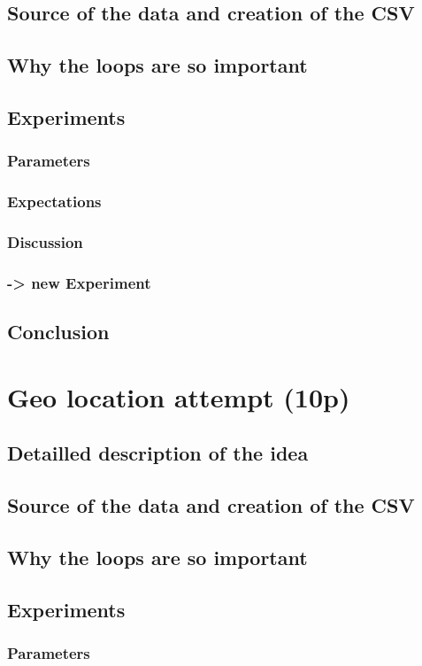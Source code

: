 \documentclass[
	11pt,
	notitlepage,
	oneside
]{scrartcl}
\begin{document}
\subsection{Source of the data and creation of the CSV}
\subsection{Why the loops are so important}
\subsection{Experiments}
\subsubsection{Parameters}
\subsubsection{Expectations}
\subsubsection{Discussion}
\subsubsection{-> new Experiment}
\subsection{Conclusion}

\section{Geo location attempt (10p)}
\subsection{Detailled description of the idea}
\subsection{Source of the data and creation of the CSV}
\subsection{Why the loops are so important}
\subsection{Experiments}
\subsubsection{Parameters}
\end{document}
